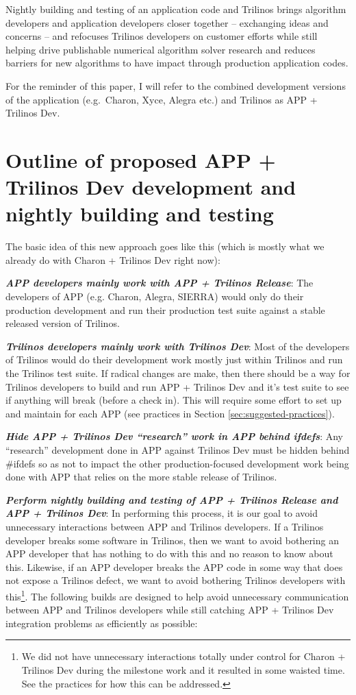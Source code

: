 \documentclass[pdf,ps2pdf,11pt]{SANDreport}
\begin{document}
Nightly building and testing of an application code and Trilinos
brings algorithm developers and application developers closer together --
exchanging ideas and concerns -- and refocuses Trilinos developers on customer 
efforts while still helping drive publishable numerical algorithm solver
research and reduces barriers for new algorithms to have impact through
production application codes.

For the reminder of this paper, I will refer to the combined development
versions of the application (e.g.\ Charon, Xyce, Alegra etc.) and Trilinos as
APP + Trilinos Dev.


%
{}\section{Outline of proposed APP + Trilinos Dev development and nightly
building and testing}
%

The basic idea of this new approach goes like this (which is mostly what we
already do with Charon + Trilinos Dev right now):

{}\textit{\textbf{APP developers mainly work with APP + Trilinos Release}}:
The developers of APP (e.g. Charon, Alegra, SIERRA) would only do their
production development and run their production test suite against a stable
released version of Trilinos.

{}\textit{\textbf{Trilinos developers mainly work with Trilinos Dev}}: Most of
the developers of Trilinos would do their development work mostly just within
Trilinos and run the Trilinos test suite.  If radical changes are make, then
there should be a way for Trilinos developers to build and run APP + Trilinos
Dev and it's test suite to see if anything will break (before a check in).
This will require some effort to set up and maintain for each APP (see
practices in Section {}\ref{sec:suggested-practices}).

{}\textit{\textbf{Hide APP + Trilinos Dev ``research'' work in APP behind
ifdefs}}: Any ``research'' development done in APP against Trilinos Dev must
be hidden behind {}\#ifdefs so as not to impact the other production-focused
development work being done with APP that relies on the more stable release of
Trilinos.

{}\textit{\textbf{Perform nightly building and testing of APP + Trilinos
Release and APP + Trilinos Dev}}: In performing this process, it is our goal
to avoid unnecessary interactions between APP and Trilinos developers.  If a
Trilinos developer breaks some software in Trilinos, then we want to avoid
bothering an APP developer that has nothing to do with this and no reason to
know about this.  Likewise, if an APP developer breaks the APP code in some
way that does not expose a Trilinos defect, we want to avoid bothering
Trilinos developers with this\footnote{We did not have unnecessary
interactions totally under control for Charon + Trilinos Dev during the
milestone work and it resulted in some waisted time.  See the practices for
how this can be addressed.}.  The following builds are designed to help avoid
unnecessary communication between APP and Trilinos developers while still
catching APP + Trilinos Dev integration problems as efficiently as possible:
\end{document}
